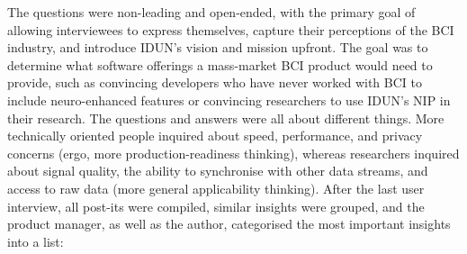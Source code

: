 The questions were non-leading and open-ended, with the primary goal of allowing interviewees to express themselves, capture their perceptions of the BCI industry, and introduce IDUN's vision and mission upfront. The goal was to determine what software offerings a mass-market BCI product would need to provide, such as convincing developers who have never worked with BCI to include neuro-enhanced features or convincing researchers to use IDUN's NIP in their research. The questions and answers were all about different things. More technically oriented people inquired about speed, performance, and privacy concerns (ergo, more production-readiness thinking), whereas researchers inquired about signal quality, the ability to synchronise with other data streams, and access to raw data (more general applicability thinking). After the last user interview, all post-its were compiled, similar insights were grouped, and the product manager, as well as the author, categorised the most important insights into a list:

